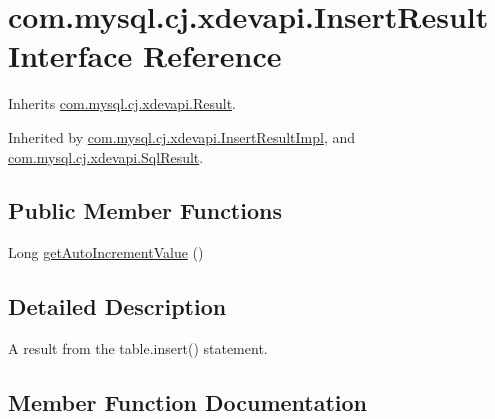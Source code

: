 \hypertarget{interfacecom_1_1mysql_1_1cj_1_1xdevapi_1_1_insert_result}{}\section{com.\+mysql.\+cj.\+xdevapi.\+Insert\+Result Interface Reference}
\label{interfacecom_1_1mysql_1_1cj_1_1xdevapi_1_1_insert_result}


Inherits \mbox{\hyperlink{interfacecom_1_1mysql_1_1cj_1_1xdevapi_1_1_result}{com.\+mysql.\+cj.\+xdevapi.\+Result}}.



Inherited by \mbox{\hyperlink{classcom_1_1mysql_1_1cj_1_1xdevapi_1_1_insert_result_impl}{com.\+mysql.\+cj.\+xdevapi.\+Insert\+Result\+Impl}}, and \mbox{\hyperlink{interfacecom_1_1mysql_1_1cj_1_1xdevapi_1_1_sql_result}{com.\+mysql.\+cj.\+xdevapi.\+Sql\+Result}}.

\subsection*{Public Member Functions}
\begin{DoxyCompactItemize}
\item 
Long \mbox{\hyperlink{interfacecom_1_1mysql_1_1cj_1_1xdevapi_1_1_insert_result_a32144e23568f91aa21dab0b01cb6b14e}{get\+Auto\+Increment\+Value}} ()
\end{DoxyCompactItemize}


\subsection{Detailed Description}
A result from the table.\+insert() statement. 

\subsection{Member Function Documentation}
\mbox{\label{interfacecom_1_1mysql_1_1cj_1_1xdevapi_1_1_insert_result_a32144e23568f91aa21dab0b01cb6b14e}} 

